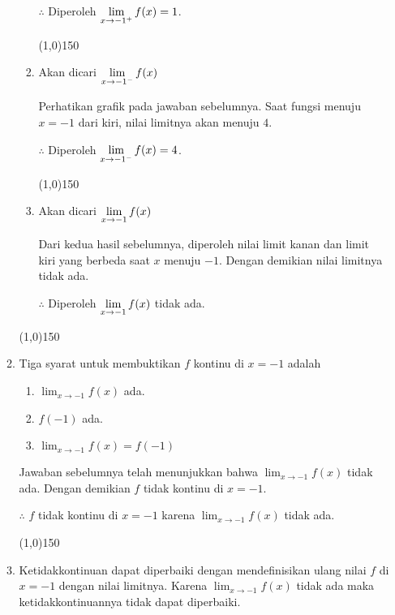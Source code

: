 \begin{enumerate}[leftmargin=*, label={\arabic*}.]
\begin{enumerate}[label={\alph*}.]
\begin{enumerate}[label={\roman*}.]
        $\therefore$ Diperoleh $\displaystyle\lim_{x\to -1^{+}} f(x) = 1$.


\begin{center}\line(1,0){150}\end{center}


        \item Akan dicari $\displaystyle\lim_{x\to -1^{-}} f(x)$
        
        Perhatikan grafik pada jawaban sebelumnya. Saat fungsi menuju $x=-1$ dari kiri, nilai 
        limitnya akan menuju $4$.

        $\therefore$ Diperoleh $\displaystyle\lim_{x\to -1^{-}} f(x) = 4$.


\begin{center}\line(1,0){150}\end{center}


        \item Akan dicari $\displaystyle\lim_{x\to -1} f(x)$
        
        Dari kedua hasil sebelumnya, diperoleh nilai limit kanan dan limit kiri yang berbeda saat 
        $x$ menuju $-1$. Dengan demikian nilai limitnya tidak ada.

        $\therefore$ Diperoleh $\displaystyle\lim_{x\to -1} f(x)$ tidak ada.

        \end{enumerate}


\begin{center}\line(1,0){150}\end{center}


    \item Tiga syarat untuk membuktikan $f$ kontinu di $x=-1$ adalah
        \begin{enumerate}[label={\arabic*}.]
        \item $\lim_{x\to -1} f(x)$ ada.
        \item $f(-1)$ ada.
        \item $\lim_{x\to -1} f(x) = f(-1)$
        \end{enumerate}

    Jawaban sebelumnya telah menunjukkan bahwa $\lim_{x\to -1} f(x)$ tidak ada. Dengan 
    demikian $f$ tidak kontinu di $x=-1$.

    $\therefore$ $f$ tidak kontinu di $x=-1$ karena $\lim_{x\to -1} f(x)$ tidak ada.


\begin{center}\line(1,0){150}\end{center}


    \item Ketidakkontinuan dapat diperbaiki dengan mendefinisikan ulang nilai $f$ di $x=-1$ dengan 
    nilai limitnya. Karena $\lim_{x\to -1} f(x)$ tidak ada maka ketidakkontinuannya tidak dapat 
    diperbaiki.


\end{enumerate}
\end{enumerate}
